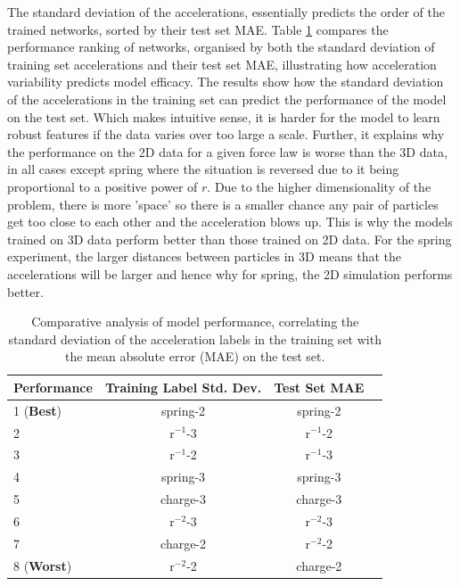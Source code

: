\documentclass[11pt]{article}
\begin{document}
The standard deviation of the accelerations, essentially predicts the order of the trained networks, sorted by their test set MAE. Table \ref{tab:std_table_2} compares the performance ranking of networks, organised by both the standard deviation of training set accelerations and their test set MAE, illustrating how acceleration variability predicts model efficacy. The results show how the standard deviation of the accelerations in the training set can predict the performance of the model on the test set. Which makes intuitive sense, it is harder for the model to learn robust features if the data varies over too large a scale. Further, it explains why the performance on the 2D data for a given force law is worse than the 3D data, in all cases except spring where the situation is reversed due to it being proportional to a positive power of $r$. Due to the higher dimensionality of the problem, there is more 'space' so there is a smaller chance any pair of particles get too close to each other and the acceleration blows up. This is why the models trained on 3D data perform better than those trained on 2D data. For the spring experiment, the larger distances between particles in 3D means that the accelerations will be larger and hence why for spring, the 2D simulation performs better.
\begin{table}[H]
    \centering
    \begin{tabular}{lccc}
    \toprule
    Performance & Training Label Std. Dev. & Test Set MAE\\
    \midrule
    1 (\textbf{Best}) & spring-2 & spring-2 \\
    2& r$^{-1}$-3 & r$^{-1}$-2  \\
    3& r$^{-1}$-2 & r$^{-1}$-3 \\
    4& spring-3 & spring-3\\
    5& charge-3 & charge-3\\
    6& r$^{-2}$-3 & r$^{-2}$-3\\
    7& charge-2 & r$^{-2}$-2\\
    8 (\textbf{Worst})& r$^{-2}$-2 & charge-2\\
    \bottomrule
    \end{tabular}
    \caption{Comparative analysis of model performance, correlating the standard deviation of the acceleration labels in the training set with the mean absolute error (MAE) on the test set.}
    \label{tab:std_table_2}
    \end{table}
\end{document}
